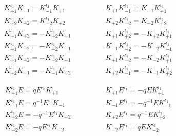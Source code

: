\documentclass[a4paper,a4paper]{article}
\begin{document}
\begin{equation}
\label{K1}
\begin{array}{c}
 K_{+1}^{\iota_1} K_{-1} = K_{-1}^{\iota_1} K_{+1} 
 \\[2mm]
 K_{+2}^{\iota_1} K_{-2} = K_{-2}^{\iota_1} K_{+2} 
 \\[2mm]
 K_{+1}^{\iota_1} K_{+2} = - K_{+2}^{\iota_1} K_{+1} 
 \\[2mm]
 K_{-1}^{\iota_1} K_{-2} = - K_{-2}^{\iota_1} K_{-1} 
 \\[2mm]
 K_{+1}^{\iota_1} K_{-2} = - K_{-2}^{\iota_1} K_{+1} 
 \\[2mm]
 K_{+2}^{\iota_1} K_{-1} = - K_{-1}^{\iota_1} K_{+2} 
\end{array}
\qquad \qquad
\begin{array}{c}
 K_{+1} K_{-1}^{\iota_1}  = K_{-1} K_{+1}^{\iota_1} 
 \\[2mm]
 K_{+2} K_{-2}^{\iota_1}  = K_{-2} K_{+2}^{\iota_1}  
 \\[2mm]
 K_{+1} K_{+2}^{\iota_1}  = - K_{+2} K_{+1}^{\iota_1}  
 \\[2mm]
 K_{-1} K_{-2}^{\iota_1}  = - K_{-2} K_{-1}^{\iota_1}  
 \\[2mm]
 K_{+1} K_{-2}^{\iota_1}  = - K_{-2} K_{+1}^{\iota_1}  
 \\[2mm]
 K_{+2} K_{-1}^{\iota_1}  = - K_{-1} K_{+2}^{\iota_1}  
\end{array}
\end{equation}

\begin{equation}
\label{K2}
\begin{array}{c}
 K_{+1}^{\iota_1} E = q E^{\iota_1} K_{+1} 
 \\[2mm]
 K_{-1}^{\iota_1} E = q^{-1} E^{\iota_1} K_{-1} 
 \\[2mm]
 K_{+2}^{\iota_1} E = - q^{-1}  E^{\iota_1} K_{+2} 
 \\[2mm]
 K_{-2}^{\iota_1} E = - q E^{\iota_1} K_{-2} 
\end{array}
\qquad \qquad
\begin{array}{c}
 K_{+1} E^{\iota_1} = - q E K_{+1}^{\iota_1} 
 \\[2mm]
 K_{-1} E^{\iota_1} = - q^{-1} EK_{-1}^{\iota_1} 
 \\[2mm]
 K_{+2} E^{\iota_1} = q^{-1}  E K_{+2}^{\iota_1} 
 \\[2mm]
 K_{-2} E^{\iota_1} = q E K_{-2}^{\iota_1} 
\end{array}
\end{equation}
\end{document}
